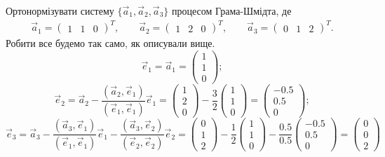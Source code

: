 \documentclass{math_library}
\begin{document}
\begin{example}
Ортонормізувати систему $\{ \vec{a}_1, \vec{a}_2, \vec{a}_3\}$ процесом Грама-Шмідта, де
\begin{align*}
\vec{a}_1 = \begin{pmatrix}
1 & 1 & 0
\end{pmatrix}^T, \qquad \vec{a}_2 = \begin{pmatrix}
1 & 2 & 0
\end{pmatrix}^T, \qquad \vec{a}_3 = \begin{pmatrix}
0 & 1 & 2
\end{pmatrix}^T.
\end{align*}
Робити все будемо так само, як описували вище.
\[
\vec{e}_1 = \vec{a}_1 = \begin{pmatrix}
1 \\ 1 \\ 0
\end{pmatrix};
\]
\[
\vec{e}_2 = \vec{a}_2 - \dfrac{(\vec{a}_2,\vec{e}_1)}{(\vec{e}_1,\vec{e}_1)} \vec{e}_1 = \begin{pmatrix}
1 \\ 2 \\ 0
\end{pmatrix} - \dfrac{3}{2} \begin{pmatrix}
1 \\ 1 \\ 0
\end{pmatrix} = \begin{pmatrix}
-0.5 \\ 0.5 \\ 0
\end{pmatrix};
\]
\[
\vec{e}_3 = \vec{a}_3 - \dfrac{(\vec{a}_3,\vec{e}_1)}{(\vec{e}_1,\vec{e}_1)} \vec{e}_1 - \dfrac{(\vec{a}_3,\vec{e}_2)}{(\vec{e}_2,\vec{e}_2)} \vec{e}_2 = \begin{pmatrix}
0 \\ 1 \\ 2
\end{pmatrix} - \dfrac{1}{2} \begin{pmatrix}
1 \\ 1 \\ 0
\end{pmatrix} - \dfrac{0.5}{0.5} \begin{pmatrix}
-0.5 \\ 0.5 \\ 0
\end{pmatrix} = \begin{pmatrix}
0 \\ 0 \\ 2

\end{pmatrix}\]
\end{example}
\end{document}
